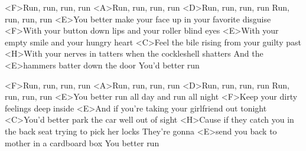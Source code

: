 
\zs
<F>Run, run, run, run
<A>Run, run, run, run
<D>Run, run, run, run
Run, run, run, run
<E>You better make your face up in your favorite disguise
<F>With your button down lips and your roller blind eyes
<E>With your empty smile and your hungry heart
<C>Feel the bile rising from your guilty past
<H>With your nerves in tatters when the cockleshell shatters
And the <E>hammers batter down the door
You'd better run
\ks

\zs
<F>Run, run, run, run
<A>Run, run, run, run
<D>Run, run, run, run
Run, run, run, run
<E>You better run all day and run all night
<F>Keep your dirty feelings deep inside
<E>And if you're taking your girlfriend out tonight
<C>You'd better park the car well out of sight
<H>Cause if they catch you in the back seat trying to pick her locks
They're gonna <E>send you back to mother in a cardboard box
You better run
\ks

\kp
